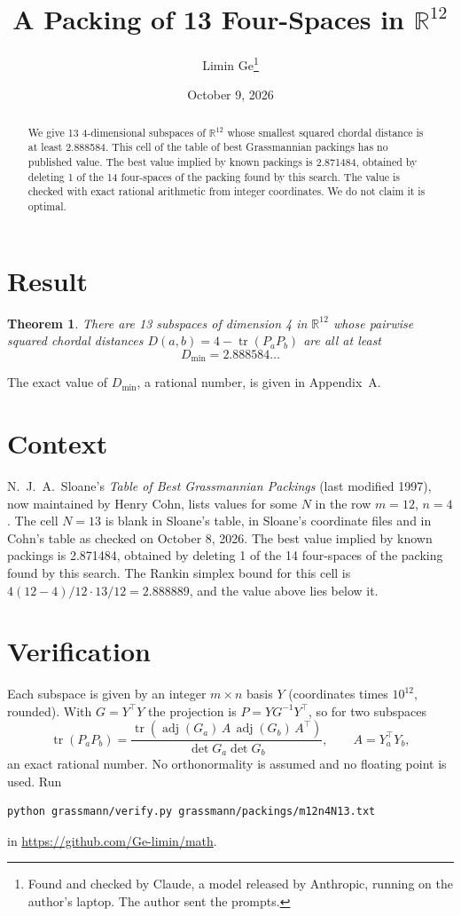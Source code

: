 \documentclass[11pt,a4paper]{article}
\title{A Packing of 13 Four-Spaces in $\mathbb{R}^{12}$}
\author{Limin Ge\thanks{Found and checked by Claude, a model released by Anthropic, running on the author's laptop. The author sent the prompts.}}
\date{October 9, 2026}
\newtheorem*{theorem}{Theorem}
\begin{document}
\maketitle
\begin{abstract}
We give 13 4-dimensional subspaces of $\mathbb{R}^{12}$ whose smallest squared chordal distance is at least 2.888584. This cell of the table of best Grassmannian packings has no published value. The best value implied by known packings is 2.871484, obtained by deleting 1 of the 14 four-spaces of the packing found by this search. The value is checked with exact rational arithmetic from integer coordinates. We do not claim it is optimal.
\end{abstract}

\section{Result}
\begin{theorem}
There are 13 subspaces of dimension 4 in $\mathbb{R}^{12}$ whose pairwise squared chordal distances $D(a,b) = 4 - \operatorname{tr}(P_aP_b)$ are all at least
\[ D_{\min} = 2.888584\ldots \]
\end{theorem}
The exact value of $D_{\min}$, a rational number, is given in Appendix~A.


\section{Context}
N.~J.~A.~Sloane's \emph{Table of Best Grassmannian Packings} (last modified 1997), now maintained by Henry Cohn, lists values for some $N$ in the row $m=12$, $n=4$. The cell $N=13$ is blank in Sloane's table, in Sloane's coordinate files and in Cohn's table as checked on October 8, 2026. The best value implied by known packings is 2.871484, obtained by deleting 1 of the 14 four-spaces of the packing found by this search. The Rankin simplex bound for this cell is $4(12-4)/12\cdot 13/12 = 2.888889$, and the value above lies below it.


\section{Verification}
Each subspace is given by an integer $m\times n$ basis $Y$ (coordinates times $10^{12}$, rounded). With $G=Y^\top Y$ the projection is $P=YG^{-1}Y^\top$, so for two subspaces
\[ \operatorname{tr}(P_aP_b)=\frac{\operatorname{tr}(\operatorname{adj}(G_a)\,A\,\operatorname{adj}(G_b)\,A^\top)}{\det G_a\det G_b},\qquad A=Y_a^\top Y_b, \]
an exact rational number. No orthonormality is assumed and no floating point is used. Run
\begin{verbatim}
python grassmann/verify.py grassmann/packings/m12n4N13.txt
\end{verbatim}
in \url{https://github.com/Ge-limin/math}.
\end{document}
